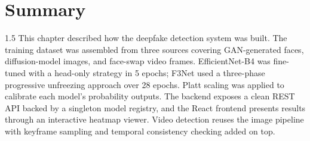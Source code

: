 \section{Summary}

\begin{spacing}{1.5}
This chapter described how the deepfake detection system was built. The training dataset was assembled from three sources covering GAN-generated faces, diffusion-model images, and face-swap video frames. EfficientNet-B4 was fine-tuned with a head-only strategy in 5 epochs; F3Net used a three-phase progressive unfreezing approach over 28 epochs. Platt scaling was applied to calibrate each model's probability outputs. The backend exposes a clean REST API backed by a singleton model registry, and the React frontend presents results through an interactive heatmap viewer. Video detection reuses the image pipeline with keyframe sampling and temporal consistency checking added on top.
\end{spacing}
